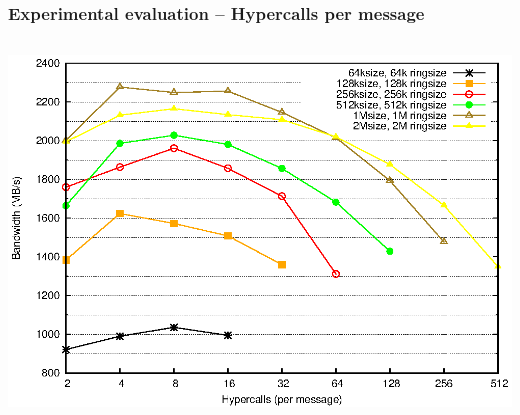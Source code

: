 \documentclass[red,slidestop,notes,compress,mathserif]{beamer}
\begin{document}
\begin{frame}
\frametitle{Experimental evaluation -- Hypercalls per message}
\begin{columns}
\includegraphics[width=\textwidth]{figures/mix.eps}
\end{columns}
\end{frame}
%
%
%
%
%
\end{document}
